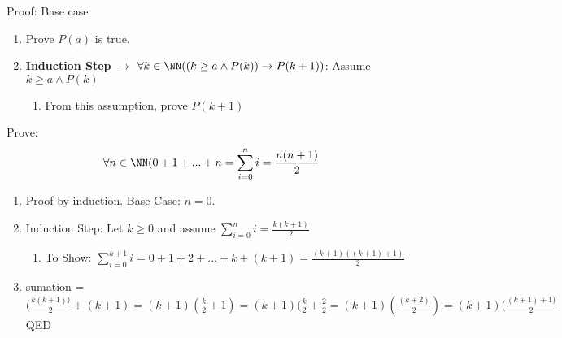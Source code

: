 Proof: Base case
\begin{enumerate}
\item Prove $P(a)$ is true.
\item \textbf{Induction Step} $\to$ $\forall k \in \NN ((k\ge a \wedge P(k)) \to P(k+1))$: Assume $k \ge a \wedge P(k)$
	\begin{enumerate}
	\item From this assumption, prove $P(k+1)$
	\end{enumerate}
\end{enumerate}

Prove: \[ \forall n \in \NN ( 0+1+...+n = \sum_{i=0}^n i = \frac{n(n+1)}{2} \]

\begin{enumerate}
\item Proof by induction. Base Case: $n = 0$.
\item Induction Step: Let $k \ge 0$ and assume $\displaystyle\sum_{i=0}^n i = \frac{k(k+1)}{2} $
	\begin{enumerate}
	\item To Show: $\displaystyle\sum_{i=0}^{k+1} i = 0 + 1 + 2 + ... + k + (k+1) = \frac{(k+1)((k+1)+1)}{2} $
	\end{enumerate}
\item sumation = $(\frac{k(k+1))}{2} + (k+1) = (k+1)(\frac{k}{2} + 1) = (k+1)(\frac{k}{2} + \frac{2}{2} = (k+1)(\frac{(k+2)}{2}) = (k+1)(\frac{(k+1)+1)}{2}$ QED 
\end{enumerate}


